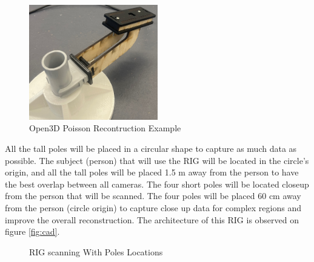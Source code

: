 \documentclass[12pt]{report}
\begin{document}
\begin{figure}[H]
  \hspace*{0.8cm}  
  \includegraphics[width=0.5\textwidth]{IMG_5896_cropped.jpg}
  \captionsetup{singlelinecheck = false, format= hang, justification=raggedright,  labelsep=space}
 \caption{Open3D Poisson Recontruction Example}
 \label{fig:short_pole} 
\end{figure}

All the tall poles will be placed in a circular shape to capture as much data as possible. 
The subject (person) that will use the RIG will be located in the circle's origin, and all the tall poles will be placed 1.5 m away from the person to have the best overlap between all cameras.
The four short poles will be located closeup from the person that will be scanned. The four poles will be placed 60 cm away from the person (circle origin) to capture close up data for complex regions and improve the overall reconstruction.
The architecture of this RIG is observed on figure \ref{fig:cad}.
\enlargethispage{\baselineskip}

\newpage

\begin{figure}[H]
  \centering
  \qquad
  \caption{RIG scanning With Poles Locations}
  \label{fig:RIG}
\end{figure}
\end{document}
